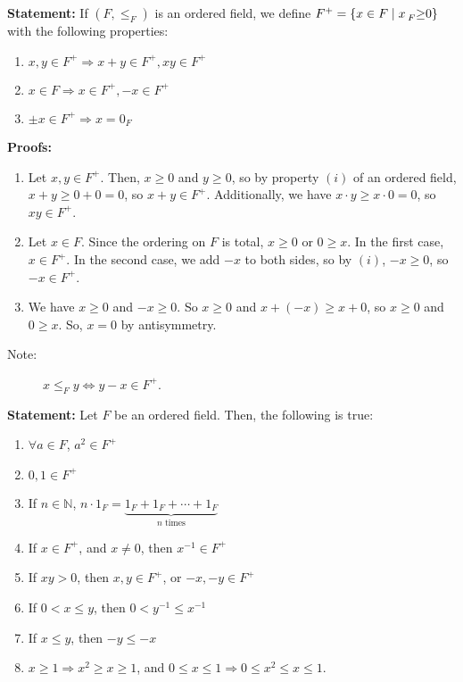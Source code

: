 \documentclass[10pt]{extarticle}
\newcommand{\N}{\mathbb{N}}
\begin{document}
    \textbf{Statement:} If $(F,\leq_F)$ is an ordered field, we define $F^+ = \{x\in F\mid x\prescript{}{F}\geq 0\}$ with the following properties:
    \begin{enumerate}[(1)]
      \item $x,y\in F^+ \Rightarrow x+y\in F^+,xy\in F^+$
      \item $x\in F \Rightarrow x\in F^+,-x\in F^+$
      \item $\pm x\in F^+ \Rightarrow x = 0_F$
    \end{enumerate}
    \textbf{Proofs:}
      \begin{enumerate}[(1)]
        \item Let $x,y\in F^+$. Then, $x\geq 0$  and $y\geq 0$, so by property $(i)$ of an ordered field, $x+y\geq 0+0 = 0$, so $x+y\in F^+$. Additionally, we have $x\cdot y \geq x\cdot 0 = 0$, so $xy \in F^+$.
        \item Let $x\in F$. Since the ordering on $F$ is total, $x \geq 0$ or $0\geq x$. In the first case, $x\in F^+$. In the second case, we add $-x$ to both sides, so by $(i)$, $-x\geq 0$, so $-x\in F^+$.
        \item We have $x\geq 0$  and $-x\geq 0$. So $x \geq 0$ and $x + (-x) \geq x+0$, so $x\geq 0$ and $0\geq x$. So, $x = 0$ by antisymmetry.
      \end{enumerate}
    \begin{description}
      \item[Note:] $x\leq_F y \Leftrightarrow y-x\in F^+$.
    \end{description}
    \textbf{Statement:} Let $F$ be an ordered field. Then, the following is true:
    \begin{enumerate}[(1)]
      \item $\forall a\in F$, $a^{2}\in F^+$
      \item $0,1\in F^+$
      \item If $n\in \N$, $n\cdot 1_{F} = \underbrace{1_F + 1_F + \cdots + 1_F}_{\text{$n$ times}}$
      \item If $x\in F^+$, and $x\neq 0$, then $x^{-1}\in F^+$
      \item If $xy > 0$, then $x,y\in F^+$, or $-x,-y\in F^{+}$
      \item If $0 < x \leq y$, then $0 < y^{-1} \leq x^{-1}$
      \item If $x\leq y$, then $-y\leq -x$
      \item $x\geq 1 \Rightarrow x^2 \geq x \geq 1$, and $0\leq x\leq 1 \Rightarrow 0 \leq x^2 \leq x \leq 1$.
    \end{enumerate}
\end{document}
